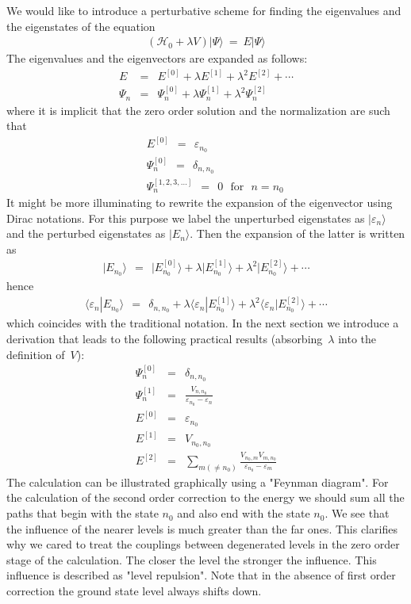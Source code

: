 \documentclass[onecolumn,fleqn, 11pt]{revtex4}
\newcommand{\beq}{\begin{eqnarray}}
\newcommand{\eeq}{\end{eqnarray}}
\begin{document}
We would like to introduce a perturbative scheme 
for finding the eigenvalues and the eigenstates of    
the equation 
\beq
(\mathcal{H}_{0}+ \lambda V) | \Psi \rangle \ = \ E | \Psi \rangle
\eeq
The eigenvalues and the eigenvectors are expanded as follows:
\beq
E
&=& E^{[0]} 
+ \lambda E^{[1]} 
+ \lambda^2 E^{[2]} + \cdots 
\\ \nonumber
\Psi_{n} 
&=& \Psi_{n}^{[0]} 
+ \lambda \Psi_{n}^{[1]} 
+ \lambda^2 \Psi_{n}^{[2]} 
\eeq
where it is implicit that the zero order 
solution and the normalization are such that  
\beq
&& E^{[0]} \ \ = \ \ \varepsilon_{n_0}  
\\ \nonumber
&& \Psi_n^{[0]} \ \ = \ \ \delta_{n,n_0}
\\ \nonumber
&& \Psi_n^{[1,2,3, \dots ]} \ \ = \ \  0 \,\,\,\, \mbox{for} \,\,\,\, n=n_0 
\eeq
It might be more illuminating to rewrite the 
expansion of the eigenvector using Dirac notations.
For this purpose we label the unperturbed 
eigenstates as $|\varepsilon_n\rangle$ and the 
perturbed eigenstates as $|E_n\rangle$. 
Then the expansion of the latter is written as  
\beq
{|E_{n_0} \rangle} 
\ \ = \ \ {|E_{n_0}^{[0]} \rangle} 
+ \lambda { |E_{n_0}^{[1]} \rangle}
+ \lambda ^2{ |E_{n_0}^{[2]} \rangle} 
+ \cdots 
\eeq
hence
\beq
\langle \varepsilon_n | E_{n_0} \rangle 
\ \ = \ \ \delta_{n,n_0}
+ \lambda \langle \varepsilon_n | E_{n_0}^{[1]} \rangle 
+ \lambda^2 \langle \varepsilon_n | E_{n_0}^{[2]} \rangle 
+ \cdots 
\eeq
which coincides with the traditional notation.
In the next section we introduce a derivation that 
leads to the following practical results (absorbing~$\lambda$ into the definition of~$V$):
\beq
\Psi_n^{[0]} &=& \delta_{n,n_0}
\\ \nonumber
\Psi_n^{[1]} &=& \frac {V_{n,n_0}}{\varepsilon_{n_0}-\varepsilon_{n}}
\\ \nonumber
E^{[0]} &=& \varepsilon_{n_{0}}
\\ \nonumber
E^{[1]} &=& V_{n_{0},n_{0}}
\\ \nonumber
E^{[2]} &=& \sum_{m (\neq n_{0})} 
\frac{V_{n_{0},m} V_{m,n_{0}}}{\varepsilon_{n_{0}}-\varepsilon_{m}}
\eeq
The calculation can be illustrated graphically 
using a "Feynman diagram".  For the calculation of the 
second order correction to the energy we should 
sum all the paths that begin with the state ${n_{0}}$ 
and also end with the state ${n_{0}}$. 
We see that the influence of the nearer levels 
is much greater than the far ones.
This clarifies why we cared to treat the couplings 
between degenerated levels in the zero order stage 
of the calculation.  
The closer the level the stronger the influence. 
This influence is described as "level repulsion". 
Note that in the absence of first order correction 
the ground state level always shifts down. 
\end{document}
